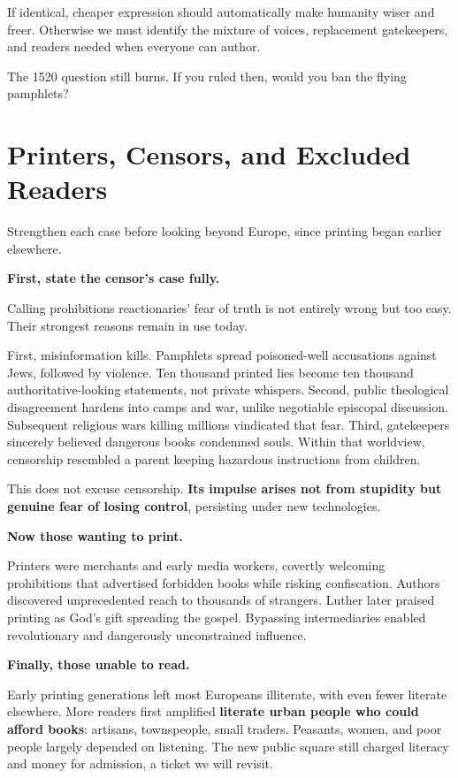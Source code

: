 If identical, cheaper expression should automatically make humanity wiser and freer. Otherwise we must identify the mixture of voices, replacement gatekeepers, and readers needed when everyone can author.

The 1520 question still burns. If you ruled then, would you ban the flying pamphlets?

\section{Printers, Censors, and Excluded Readers}
Strengthen each case before looking beyond Europe, since printing began earlier elsewhere.

\textbf{First, state the censor's case fully.}

Calling prohibitions reactionaries' fear of truth is not entirely wrong but too easy. Their strongest reasons remain in use today.

First, misinformation kills. Pamphlets spread poisoned-well accusations against Jews, followed by violence. Ten thousand printed lies become ten thousand authoritative-looking statements, not private whispers. Second, public theological disagreement hardens into camps and war, unlike negotiable episcopal discussion. Subsequent religious wars killing millions vindicated that fear. Third, gatekeepers sincerely believed dangerous books condemned souls. Within that worldview, censorship resembled a parent keeping hazardous instructions from children.

This does not excuse censorship. \textbf{Its impulse arises not from stupidity but genuine fear of losing control}, persisting under new technologies.

\textbf{Now those wanting to print.}

Printers were merchants and early media workers, covertly welcoming prohibitions that advertised forbidden books while risking confiscation. Authors discovered unprecedented reach to thousands of strangers. Luther later praised printing as God's gift spreading the gospel. Bypassing intermediaries enabled revolutionary and dangerously unconstrained influence.

\textbf{Finally, those unable to read.}

Early printing generations left most Europeans illiterate, with even fewer literate elsewhere. More readers first amplified \textbf{literate urban people who could afford books}: artisans, townspeople, small traders. Peasants, women, and poor people largely depended on listening. The new public square still charged literacy and money for admission, a ticket we will revisit.

